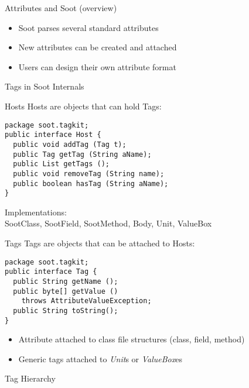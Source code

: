\begin{slide}{Attributes and Soot (overview)}
\vspace*{-5mm}
\begin{itemize}
\item Soot parses several standard attributes 
\item New attributes can be created and attached 
\item Users can design their own attribute format
\end{itemize}
\end{slide}

\begin{slide}{Tags in Soot Internals}
\end{slide}

\begin{slide}{Hosts}
{\red Host}s are objects that can hold {\red Tag}s:
{\small
\begin{verbatim}
package soot.tagkit;
public interface Host {
  public void addTag (Tag t); 
  public Tag getTag (String aName); 
  public List getTags ();
  public void removeTag (String name); 
  public boolean hasTag (String aName); 
}   
\end{verbatim}
}
Implementations:\\
{\small SootClass, SootField, SootMethod, Body, Unit, ValueBox}
\end{slide}

\begin{slide}{Tags}
{\red Tag}s are objects that can be attached to {\red Host}s:
\small{
\begin{verbatim}
package soot.tagkit;
public interface Tag {
  public String getName ();  
  public byte[] getValue () 
    throws AttributeValueException; 
  public String toString();
}
\end{verbatim}
}
\begin{itemize}
\item {\red Attribute} attached to class file structures (class, field, method)
\item Generic tags attached to {\em Unit}s or {\em ValueBox}es
\end{itemize}
\end{slide}

\begin{slide}{Tag Hierarchy}
\end{slide}

